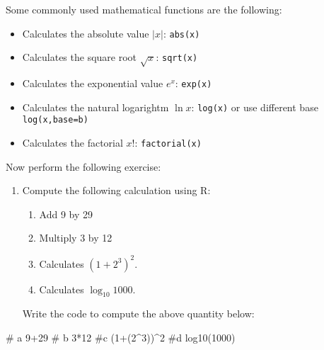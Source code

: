 \documentclass[
  letterpaper,
  DIV=11,
  numbers=noendperiod]{scrartcl}
\newenvironment{Shaded}{\begin{snugshade}}{\end{snugshade}}
\newcommand{\CommentTok}[1]{\textcolor[rgb]{0.37,0.37,0.37}{#1}}
\newcommand{\DecValTok}[1]{\textcolor[rgb]{0.68,0.00,0.00}{#1}}
\newcommand{\FunctionTok}[1]{\textcolor[rgb]{0.28,0.35,0.67}{#1}}
\newcommand{\NormalTok}[1]{\textcolor[rgb]{0.00,0.23,0.31}{#1}}
\newcommand{\SpecialCharTok}[1]{\textcolor[rgb]{0.37,0.37,0.37}{#1}}
\providecommand{\tightlist}{%
  \setlength{\itemsep}{0pt}\setlength{\parskip}{0pt}}\usepackage{longtable,booktabs,array}
\begin{document}
Some commonly used mathematical functions are the following:

\begin{itemize}
\tightlist
\item
  Calculates the absolute value \(|x|\): \texttt{abs(x)}
\item
  Calculates the square root \(\sqrt{x}\): \texttt{sqrt(x)}
\item
  Calculates the exponential value \(e^x\): \texttt{exp(x)}
\item
  Calculates the natural logarightm \(\ln{x}\): \texttt{log(x)} or use
  different base \texttt{log(x,base=b)}
\item
  Calculates the factorial \(x!\): \texttt{factorial(x)}
\end{itemize}

Now perform the following exercise:

\begin{enumerate}
\def\labelenumi{\arabic{enumi}.}
\item
  Compute the following calculation using R:

  \begin{enumerate}
  \def\labelenumii{\alph{enumii}.}
  \tightlist
  \item
    Add 9 by 29
  \item
    Multiply 3 by 12
  \item
    Calculates \((1+2^3)^2\).
  \item
    Calculates \(\log_{10} 1000\).
  \end{enumerate}

  Write the code to compute the above quantity below:
\end{enumerate}

\begin{Shaded}
\begin{Highlighting}[]
\CommentTok{\# a}
\DecValTok{9}\SpecialCharTok{+}\DecValTok{29}
\CommentTok{\# b}
\DecValTok{3}\SpecialCharTok{*}\DecValTok{12}
\CommentTok{\#c}
\NormalTok{(}\DecValTok{1}\SpecialCharTok{+}\NormalTok{(}\DecValTok{2}\SpecialCharTok{\^{}}\DecValTok{3}\NormalTok{))}\SpecialCharTok{\^{}}\DecValTok{2}
\CommentTok{\#d}
\FunctionTok{log10}\NormalTok{(}\DecValTok{1000}\NormalTok{)}
\end{Highlighting}
\end{Shaded}
\end{document}
